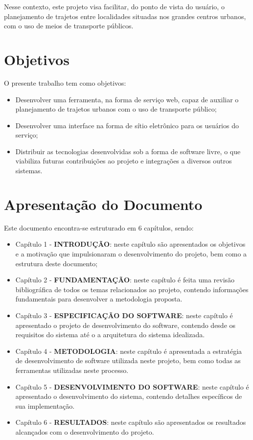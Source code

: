 Nesse contexto, este projeto visa facilitar, do ponto de vista do usuário, o planejamento de trajetos entre localidades situadas nos grandes centros urbanos, com o uso de meios de transporte públicos.

\section{Objetivos}

O presente trabalho tem como objetivos:

\begin{itemize}
	\item Desenvolver uma ferramenta, na forma de serviço web, capaz de auxiliar o planejamento de trajetos urbanos com o uso de transporte público;
	\item Desenvolver uma interface na forma de sítio eletrônico para os usuários do serviço;
	\item Distribuir as tecnologias desenvolvidas sob a forma de software livre, o que viabiliza futuras contribuições ao projeto e integrações a diversos outros sistemas.
\end{itemize}

\section{Apresentação do Documento}
Este documento encontra-se estruturado em 6 capítulos, sendo:

\begin{itemize}
	\item Capítulo 1 - \textbf{INTRODUÇÃO}: neste capítulo são apresentados os objetivos e a motivação que impulsionaram o desenvolvimento do projeto, bem como a estrutura deste documento;

	\item Capítulo 2 - \textbf{FUNDAMENTAÇÃO}: neste capítulo é feita uma revisão bibliográfica de todos os temas relacionados ao projeto, contendo informações fundamentais para desenvolver a metodologia proposta.

	\item Capítulo 3 - \textbf{ESPECIFICAÇÃO DO SOFTWARE}: neste capítulo é apresentado o projeto de desenvolvimento do software, contendo desde os requisitos do sistema até o a arquitetura do sistema idealizada.

	\item Capítulo 4 - \textbf{METODOLOGIA}: neste capítulo é apresentada a estratégia de desenvolvimento de software utilizada neste projeto, bem como todas as ferramentas utilizadas neste processo. 

	\item Capítulo 5 - \textbf{DESENVOLVIMENTO DO SOFTWARE}: neste capítulo é apresentado o desenvolvimento do sistema, contendo detalhes específicos de sua implementação.

	\item Capítulo 6 - \textbf{RESULTADOS}: neste capítulo são apresentados os resultados alcançados com o desenvolvimento do projeto.

\end{itemize}